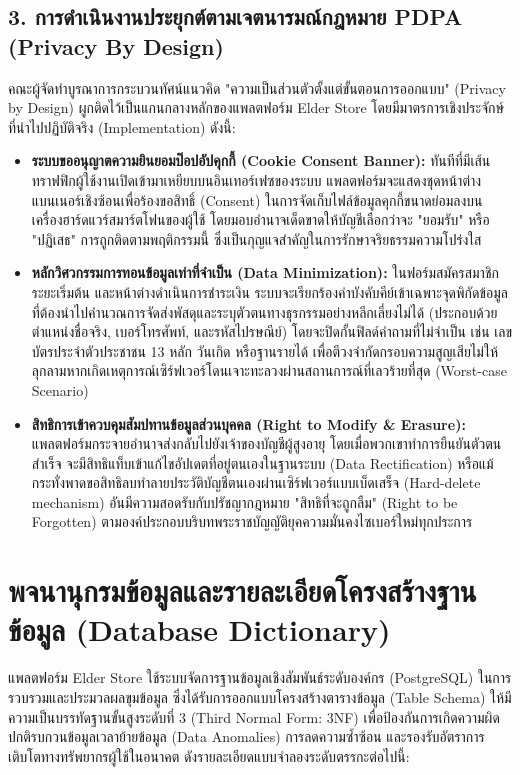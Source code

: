\subsection{3. การดำเนินงานประยุกต์ตามเจตนารมณ์กฎหมาย PDPA (Privacy By Design)}
คณะผู้จัดทำบูรณาการกระบวนทัศน์แนวคิด "ความเป็นส่วนตัวตั้งแต่ขั้นตอนการออกแบบ" (Privacy by Design) ผูกติดไว้เป็นแกนกลางหลักของแพลตฟอร์ม Elder Store โดยมีมาตรการเชิงประจักษ์ที่นำไปปฏิบัติจริง (Implementation) ดังนี้:

\begin{itemize}
    \item \textbf{ระบบขออนุญาตความยินยอมป๊อปอัปคุกกี้ (Cookie Consent Banner):} ทันทีที่มีเส้นทราฟฟิกผู้ใช้งานเปิดเข้ามาเหยียบบนอินเทอร์เฟซของระบบ แพลตฟอร์มจะแสดงชุดหน้าต่างแบนเนอร์เชิงซ้อนเพื่อร้องขอสิทธิ์ (Consent) ในการจัดเก็บไฟล์ข้อมูลคุกกี้ขนาดย่อมลงบนเครื่องฮาร์ดแวร์สมาร์ตโฟนของผู้ใช้ โดยมอบอำนาจเด็ดขาดให้บัญชีเลือกว่าจะ "ยอมรับ" หรือ "ปฏิเสธ" การถูกติดตามพฤติกรรมนี้ ซึ่งเป็นกุญแจสำคัญในการรักษาจริยธรรมความโปร่งใส
    \item \textbf{หลักวิศวกรรมการทอนข้อมูลเท่าที่จำเป็น (Data Minimization):} ในฟอร์มสมัครสมาชิกระยะเริ่มต้น และหน้าต่างดำเนินการชำระเงิน ระบบจะเรียกร้องค่าบังคับคีย์เข้าเฉพาะจุดพิกัดข้อมูลที่ต้องนำไปคำนวณการจัดส่งพัสดุและระบุตัวตนทางธุรกรรมอย่างหลีกเลี่ยงไม่ได้ (ประกอบด้วย ตำแหน่งชื่อจริง, เบอร์โทรศัพท์, และรหัสไปรษณีย์) โดยจะปิดกั้นฟิลด์คำถามที่ไม่จำเป็น เช่น เลขบัตรประจำตัวประชาชน 13 หลัก วันเกิด หรือฐานรายได้ เพื่อตีวงจำกัดกรอบความสูญเสียไม่ให้ลุกลามหากเกิดเหตุการณ์เซิร์ฟเวอร์โดนเจาะทะลวงผ่านสถานการณ์ที่เลวร้ายที่สุด (Worst-case Scenario)
    \item \textbf{สิทธิการเข้าควบคุมสัมปทานข้อมูลส่วนบุคคล (Right to Modify \& Erasure):} แพลตฟอร์มกระจายอำนาจส่งกลับไปยังเจ้าของบัญชีผู้สูงอายุ โดยเมื่อพวกเขาทำการยืนยันตัวตนสำเร็จ จะมีสิทธิแท็บเข้าแก้ไขอัปเดตที่อยู่ตนเองในฐานระบบ (Data Rectification) หรือแม้กระทั่งพาดขอสิทธิลบทำลายประวัติบัญชีตนเองผ่านเซิร์ฟเวอร์แบบเบ็ดเสร็จ (Hard-delete mechanism) อันมีความสอดรับกับปรัชญากฎหมาย "สิทธิที่จะถูกลืม" (Right to be Forgotten) ตามองค์ประกอบบริบทพระราชบัญญัติยุคความมั่นคงไซเบอร์ใหม่ทุกประการ
\end{itemize}



\section{พจนานุกรมข้อมูลและรายละเอียดโครงสร้างฐานข้อมูล (Database Dictionary)}
แพลตฟอร์ม Elder Store ใช้ระบบจัดการฐานข้อมูลเชิงสัมพันธ์ระดับองค์กร (PostgreSQL) \cite{postgresql2023} ในการรวบรวมและประมวลผลขุมข้อมูล ซึ่งได้รับการออกแบบโครงสร้างตารางข้อมูล (Table Schema) ให้มีความเป็นบรรทัดฐานขั้นสูงระดับที่ 3 (Third Normal Form: 3NF) เพื่อป้องกันการเกิดความผิดปกติรบกวนข้อมูลเวลาย้ายข้อมูล (Data Anomalies) การลดความซ้ำซ้อน และรองรับอัตราการเติบโตทางทรัพยากรผู้ใช้ในอนาคต ดังรายละเอียดแบบจำลองระดับตรรกะต่อไปนี้:

